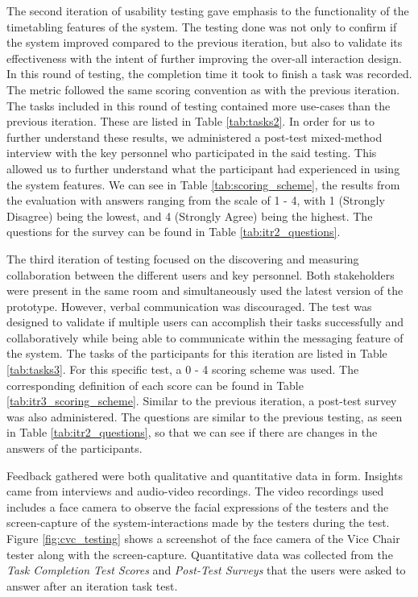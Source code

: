 The second iteration of usability testing gave emphasis to the functionality of the timetabling features of the system. The testing done was not only to confirm if the system improved compared to the previous iteration, but also to validate its effectiveness with the intent of further improving the over-all interaction design. In this round of testing, the completion time it took to finish a task was recorded. The metric followed the same scoring convention as with the previous iteration. The tasks included in this round of testing contained more use-cases than the previous iteration. These are listed in Table \ref{tab:tasks2}. In order for us to further understand these results, we administered a post-test mixed-method interview  with the key personnel who participated in the said testing. This allowed us to further understand what the participant had experienced in using the system features. We can see in Table \ref{tab:scoring_scheme}, the results from the evaluation with answers ranging from the scale of 1 - 4, with 1 (Strongly Disagree) being the lowest, and 4 (Strongly Agree) being the highest. The questions for the survey can be found in Table \ref{tab:itr2_questions}. 

The third iteration of testing focused on the discovering and measuring collaboration between the different users and key personnel. Both stakeholders were present in the same room and simultaneously used the  latest version of the prototype. However, verbal communication was discouraged. The test was designed to validate if multiple users can accomplish their tasks successfully and collaboratively while being able to communicate within the messaging feature of the system. The tasks of the participants for this iteration are listed in Table \ref{tab:tasks3}. For this speciﬁc test, a 0 - 4 scoring scheme was used. The corresponding deﬁnition of each score can be found in Table \ref{tab:itr3_scoring_scheme}. Similar to the previous iteration, a post-test survey was also administered. The questions are similar to the previous testing, as seen in Table \ref{tab:itr2_questions}, so that we can see if there are changes in the answers of the participants. 

Feedback gathered were both qualitative and quantitative data in form. Insights came from interviews and audio-video recordings. The video recordings used includes a face camera to observe the facial expressions of the testers and the screen-capture of the system-interactions made by the testers during the test. Figure \ref{fig:cvc_testing} shows a screenshot of the face camera of the Vice Chair tester along with the screen-capture. Quantitative data was collected from the \textit{Task Completion Test Scores} and \textit{Post-Test Surveys} that the users were asked to answer after an iteration task test. 


